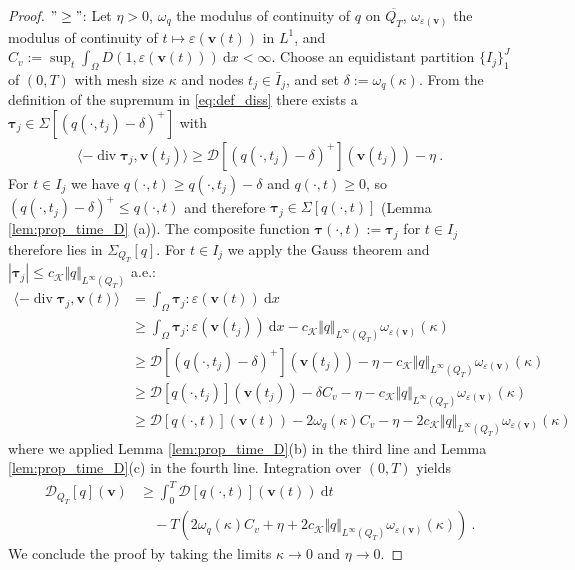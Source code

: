 \documentclass{article}
\theoremstyle{definition}
\newcommand{\bfv}{\boldsymbol{v}}
\newcommand{\bftau}{\boldsymbol{\tau}}
\newcommand{\K}{\mathcal{K}}
\newcommand{\D}{\mathcal{D}}
\newcommand{\dd}{\:\mathrm{d}}
\renewcommand\div{\operatorname{\mathrm{div}}}
\begin{document}
\begin{proof}
    $"\geq"$: Let $\eta >0$, $\omega_q$ the modulus of continuity of $q$ on $\overline{Q_T}$, $\omega_{\varepsilon(\bfv)}$
    the modulus of continuity of $t\mapsto \varepsilon(\bfv(t))$ in $L^{1}$, and $C_v := \sup_t \int_\Omega D(1,\varepsilon(\bfv(t)))\dd x<\infty$.
    Choose an equidistant partition $\{I_j\}_1^{J}$ of $(0,T)$ with mesh size $\kappa$ and nodes $t_j \in \bar I_j$,
    and set $\delta := \omega_q(\kappa)$. From the definition of the supremum in \eqref{eq:def_diss} there
    exists a $\bftau_j \in \Sigma[(q(\cdot,t_j)-\delta)^{+}]$ with
    \begin{align*}
        \langle - \div \bftau_j, \bfv(t_j)\rangle \geq \D[(q(\cdot,t_j)-\delta)^+](\bfv(t_j)) - \eta  \ .
    \end{align*}
    For $t\in I_j$ we have $q(\cdot,t)\geq q(\cdot,t_j) - \delta$ and $q(\cdot, t) \geq 0$, so $(q(\cdot,t_j)-\delta)^+ \leq q(\cdot,t)$
    and therefore $\bftau_j\in \Sigma[q(\cdot,t)]$ (Lemma \ref{lem:prop_time_D} (a)). The composite function
    $\bftau(\cdot,t) := \bftau_j$ for $t\in I_j$ therefore lies in $\Sigma_{Q_T}[q]$. For $t\in I_j$
    we apply the Gauss theorem and $|\bftau_j|\leq c_\K \Vert q\Vert_{L^{\infty}(Q_T)}$ a.e.:
    \begin{align*}
        \langle - \div \bftau_j, \bfv(t) \rangle &= \int_\Omega \bftau_j : \varepsilon(\bfv(t)) \dd x\\
        &\geq \int_\Omega \bftau_j : \varepsilon(\bfv(t_j)) \dd x - c_\K \Vert q\Vert_{L^{\infty}(Q_T)} \omega_{\varepsilon(\bfv)}(\kappa)\\
        &\geq \D[(q(\cdot,t_j)-\delta)^{+}](\bfv(t_j)) - \eta -  c_\K \Vert q\Vert_{L^{\infty}(Q_T)} \omega_{\varepsilon(\bfv)}(\kappa)\\
        &\geq \D[q(\cdot,t_j)](\bfv(t_j)) - \delta C_v -\eta -  c_\K \Vert q\Vert_{L^{\infty}(Q_T)} \omega_{\varepsilon(\bfv)}(\kappa)\\
        &\geq \D[q(\cdot,t)](\bfv(t)) - 2\omega_q(\kappa) C_v -\eta - 2 c_\K \Vert q\Vert_{L^{\infty}(Q_T)} \omega_{\varepsilon(\bfv)}(\kappa)
    \end{align*}
    where we applied Lemma \ref{lem:prop_time_D}(b) in the third line and Lemma \ref{lem:prop_time_D}(c) in the fourth line. Integration over $(0,T)$ yields
    \begin{align*}
        \D_{Q_T}[q](\bfv) &\geq \int_{0}^{T} \D[q(\cdot,t)](\bfv(t)) \dd t\\
        &\quad - T ( 2\omega_q(\kappa) C_v+\eta + 2 c_\K \Vert q\Vert_{L^{\infty}(Q_T)} \omega_{\varepsilon(\bfv)}(\kappa)) \ .
    \end{align*}
    We conclude the proof by taking the limits $\kappa \rightarrow 0$ and $\eta \rightarrow 0$.
\end{proof}
\end{document}
